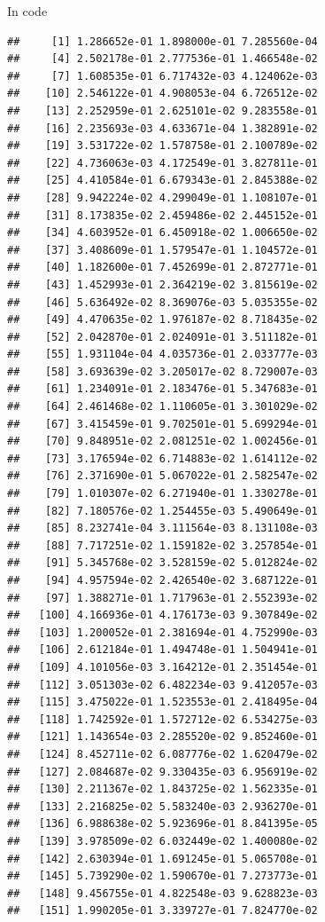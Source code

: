 \documentclass[ignorenonframetext,]{beamer}
\begin{document}
\begin{frame}[fragile]{In code}
\begin{verbatim}
##     [1] 1.286652e-01 1.898000e-01 7.285560e-04
##     [4] 2.502178e-01 2.777536e-01 1.466548e-02
##     [7] 1.608535e-01 6.717432e-03 4.124062e-03
##    [10] 2.546122e-01 4.908053e-04 6.726512e-02
##    [13] 2.252959e-01 2.625101e-02 9.283558e-01
##    [16] 2.235693e-03 4.633671e-04 1.382891e-02
##    [19] 3.531722e-02 1.578758e-01 2.100789e-02
##    [22] 4.736063e-03 4.172549e-01 3.827811e-01
##    [25] 4.410584e-01 6.679343e-01 2.845388e-02
##    [28] 9.942224e-02 4.299049e-01 1.108107e-01
##    [31] 8.173835e-02 2.459486e-02 2.445152e-01
##    [34] 4.603952e-01 6.450918e-02 1.006650e-02
##    [37] 3.408609e-01 1.579547e-01 1.104572e-01
##    [40] 1.182600e-01 7.452699e-01 2.872771e-01
##    [43] 1.452993e-01 2.364219e-02 3.815619e-02
##    [46] 5.636492e-02 8.369076e-03 5.035355e-02
##    [49] 4.470635e-02 1.976187e-02 8.718435e-02
##    [52] 2.042870e-01 2.024091e-01 3.511182e-01
##    [55] 1.931104e-04 4.035736e-01 2.033777e-03
##    [58] 3.693639e-02 3.205017e-02 8.729007e-03
##    [61] 1.234091e-01 2.183476e-01 5.347683e-01
##    [64] 2.461468e-02 1.110605e-01 3.301029e-02
##    [67] 3.415459e-01 9.702501e-01 5.699294e-01
##    [70] 9.848951e-02 2.081251e-02 1.002456e-01
##    [73] 3.176594e-02 6.714883e-02 1.614112e-02
##    [76] 2.371690e-01 5.067022e-01 2.582547e-02
##    [79] 1.010307e-02 6.271940e-01 1.330278e-01
##    [82] 7.180576e-02 1.254455e-03 5.490649e-01
##    [85] 8.232741e-04 3.111564e-03 8.131108e-03
##    [88] 7.717251e-02 1.159182e-02 3.257854e-01
##    [91] 5.345768e-02 3.528159e-02 5.012824e-02
##    [94] 4.957594e-02 2.426540e-02 3.687122e-01
##    [97] 1.388271e-01 1.717963e-01 2.552393e-02
##   [100] 4.166936e-01 4.176173e-03 9.307849e-02
##   [103] 1.200052e-01 2.381694e-01 4.752990e-03
##   [106] 2.612184e-01 1.494748e-01 1.504941e-01
##   [109] 4.101056e-03 3.164212e-01 2.351454e-01
##   [112] 3.051303e-02 6.482234e-03 9.412057e-03
##   [115] 3.475022e-01 1.523553e-01 2.418495e-04
##   [118] 1.742592e-01 1.572712e-02 6.534275e-03
##   [121] 1.143654e-03 2.285520e-02 9.852460e-01
##   [124] 8.452711e-02 6.087776e-02 1.620479e-02
##   [127] 2.084687e-02 9.330435e-03 6.956919e-02
##   [130] 2.211367e-02 1.843725e-02 1.562335e-01
##   [133] 2.216825e-02 5.583240e-03 2.936270e-01
##   [136] 6.988638e-02 5.923696e-01 8.841395e-05
##   [139] 3.978509e-02 6.032449e-02 1.400080e-02
##   [142] 2.630394e-01 1.691245e-01 5.065708e-01
##   [145] 5.739290e-02 1.590670e-01 7.273773e-01
##   [148] 9.456755e-01 4.822548e-03 9.628823e-03
##   [151] 1.990205e-01 3.339727e-01 7.824770e-02

\end{verbatim}
\end{frame}
\end{document}
